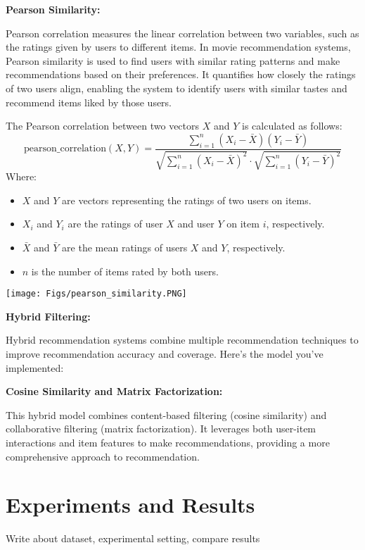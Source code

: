 \documentclass[a4paper]{article}
\theoremstyle{plain}
\theoremstyle{definition}
\begin{document}
\bigskip
\textbf{\large \color[RGB]{50,50,50} Pearson Similarity:}

Pearson correlation measures the linear correlation between two variables, such as the ratings given by users to different items. In movie recommendation systems, Pearson similarity is used to find users with similar rating patterns and make recommendations based on their preferences. It quantifies how closely the ratings of two users align, enabling the system to identify users with similar tastes and recommend items liked by those users.


The Pearson correlation between two vectors $X$ and $Y$ is calculated as follows:
\[
\text{pearson\_correlation}(X, Y) = \frac{{\sum_{i=1}^{n}(X_i - \bar{X})(Y_i - \bar{Y})}}{{\sqrt{\sum_{i=1}^{n}(X_i - \bar{X})^2} \cdot \sqrt{\sum_{i=1}^{n}(Y_i - \bar{Y})^2}}}
\]
Where:
\begin{itemize}
    \item $X$ and $Y$ are vectors representing the ratings of two users on items.
    \item $X_i$ and $Y_i$ are the ratings of user $X$ and user $Y$ on item $i$, respectively.
    \item $\bar{X}$ and $\bar{Y}$ are the mean ratings of users $X$ and $Y$, respectively.
    \item $n$ is the number of items rated by both users.
\end{itemize}

\texttt{[image: Figs/pearson\_similarity.PNG]}

\bigskip

\textbf{\Large Hybrid Filtering:}
\bigskip

Hybrid recommendation systems combine multiple recommendation techniques to improve recommendation accuracy and coverage. Here's the model you've implemented:

\bigskip
\textbf{\large \color[RGB]{50,50,50} Cosine Similarity and Matrix Factorization:}

This hybrid model combines content-based filtering (cosine similarity) and collaborative filtering (matrix factorization). It leverages both user-item interactions and item features to make recommendations, providing a more comprehensive approach to recommendation.



	
	\section{\LARGE Experiments and Results}
	\label{sec:app}
	Write about dataset, experimental setting, compare results
\end{document}
